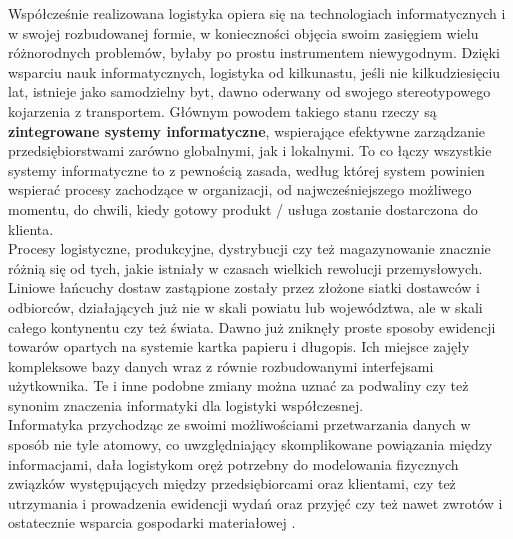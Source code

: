 	Współcześnie realizowana logistyka opiera się na technologiach informatycznych i w swojej rozbudowanej
	formie, w konieczności objęcia swoim zasięgiem wielu różnorodnych problemów, byłaby po prostu instrumentem
	niewygodnym. Dzięki wsparciu nauk informatycznych, logistyka od kilkunastu, jeśli nie kilkudziesięciu lat,
	istnieje jako samodzielny byt, dawno oderwany od swojego stereotypowego kojarzenia z transportem. Głównym
	powodem takiego stanu rzeczy są \textbf{zintegrowane systemy informatyczne}, wspierające efektywne zarządzanie
	przedsiębiorstwami zarówno globalnymi, jak i lokalnymi. To co łączy wszystkie systemy informatyczne to
	z pewnością zasada, według której system powinien wspierać procesy zachodzące w organizacji, od najwcześniejszego
	możliwego momentu, do chwili, kiedy gotowy produkt / usługa zostanie dostarczona do klienta. \\
	
	Procesy logistyczne, produkcyjne, dystrybucji czy też magazynowanie znacznie różnią się od tych, jakie istniały
	w czasach wielkich rewolucji przemysłowych. Liniowe łańcuchy dostaw zastąpione zostały przez złożone siatki dostawców i odbiorców,
	działających już nie w skali powiatu lub województwa, ale w skali całego kontynentu czy też świata. Dawno
	już zniknęły proste sposoby ewidencji towarów opartych na systemie kartka papieru i długopis. Ich miejsce zajęły
	kompleksowe bazy danych wraz z równie rozbudowanymi interfejsami użytkownika. Te i inne podobne zmiany można
	uznać za podwaliny czy też synonim znaczenia informatyki dla logistyki współczesnej. \\ 
	
	Informatyka przychodząc ze swoimi możliwościami przetwarzania danych w sposób nie tyle atomowy, co uwzględniający
	skomplikowane powiązania między informacjami, dała logistykom oręż potrzebny do modelowania 
	fizycznych związków występujących między przedsiębiorcami oraz klientami, czy też utrzymania i prowadzenia
	ewidencji wydań oraz przyjęć czy też nawet zwrotów i ostatecznie wsparcia gospodarki materiałowej \cite{IDL}.
	
\pagebreak
